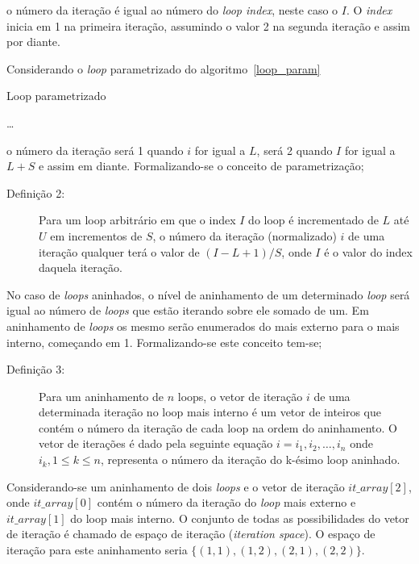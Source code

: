 o número da iteração é igual ao número do \textit{loop index}, neste caso o $I$.
O \textit{index} inicia em 1 na primeira iteração, assumindo o valor 2 na
segunda iteração e assim por diante.

Considerando o \textit{loop} parametrizado do algoritmo~\ref{loop_param}

\begin{algorithm}
        \caption{Loop parametrizado}
        \label{loop_param}
        \begin{algorithmic}[1]
                \STATE \ldots
                \ENDFOR
        \end{algorithmic}
\end{algorithm}

o número da iteração será 1 quando $i$ for igual a $L$, será 2 quando $I$ for
igual a $L+S$ e assim em diante. 
Formalizando-se o conceito de parametrização;

\begin{description}
        \item [Definição 2:] Para um loop arbitrário em que o index $I$ do loop é
        incrementado de $L$ até $U$ em incrementos de $S$, o número da iteração
        (normalizado) $i$ de uma iteração qualquer terá o valor de 
        $(I - L + 1)/ S$, onde $I$ é o valor do index daquela iteração.
\end{description}

No caso de \textit{loops} aninhados, o nível de aninhamento de um determinado 
\textit{loop} será igual ao número de \textit{loops} que estão iterando sobre
ele somado de um. Em aninhamento de \textit{loops} os mesmo serão enumerados do
mais externo para o mais interno, começando em 1. Formalizando-se este conceito
tem-se;

\begin{description}
        \item[Definição 3:] Para um aninhamento de $n$ loops, o vetor de
                iteração $i$ de uma determinada iteração no loop mais interno 
                é um vetor de inteiros que contém o número da iteração de cada 
                loop na ordem do aninhamento. 
                O vetor de iterações é dado pela seguinte equação
                $i = {i_1, i_2, \ldots, i_n}$
                onde $i_k, 1 \leq k \leq n$, representa o número da iteração do 
                k-ésimo loop aninhado.
\end{description}

Considerando-se um aninhamento de dois \textit{loops} e o vetor de iteração
$it\_array[2]$, onde $it\_array[0]$ contém o número da iteração do \textit{loop}
mais externo e $it\_array[1]$ do loop mais interno. 
O conjunto de todas as possibilidades do vetor de iteração é chamado de espaço 
de iteração (\textit{iteration space}). 
O espaço de iteração para este aninhamento seria $\{(1,1),(1,2),(2,1),(2,2)\}$.

